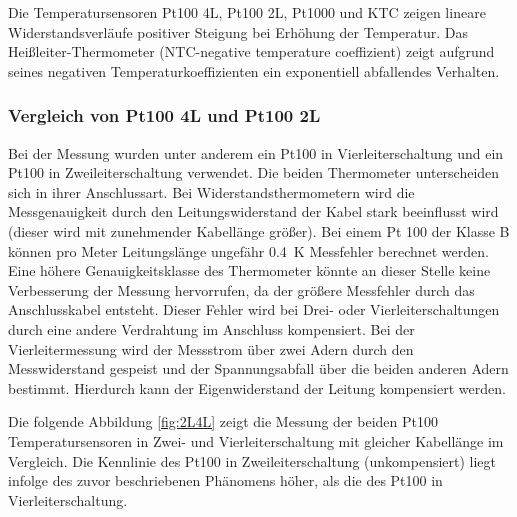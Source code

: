 Die Temperatursensoren Pt100 4L, Pt100 2L, Pt1000 und KTC zeigen lineare Widerstandsverläufe positiver Steigung bei Erhöhung der Temperatur. Das Heißleiter-Thermometer (NTC-negative temperature coeffizient) zeigt aufgrund seines negativen Temperaturkoeffizienten ein exponentiell abfallendes Verhalten. 

\subsubsection{Vergleich von Pt100 4L und Pt100 2L}

Bei der Messung wurden unter anderem ein Pt100 in Vierleiterschaltung und ein Pt100 in Zweileiterschaltung verwendet. Die beiden Thermometer unterscheiden sich in ihrer Anschlussart. Bei Widerstandsthermometern wird die Messgenauigkeit durch den Leitungswiderstand der Kabel stark beeinflusst wird (dieser wird mit zunehmender Kabellänge größer). Bei einem Pt 100 der Klasse B können pro Meter Leitungslänge ungefähr \SI{0,4}{\kelvin} Messfehler berechnet werden. Eine höhere Genauigkeitsklasse des Thermometer könnte an dieser Stelle keine Verbesserung der Messung hervorrufen, da der größere Messfehler durch das Anschlusskabel entsteht. 
Dieser Fehler wird bei Drei- oder Vierleiterschaltungen durch eine andere Verdrahtung im Anschluss kompensiert. Bei der Vierleitermessung wird der Messstrom über zwei Adern durch den Messwiderstand gespeist und der Spannungsabfall über die beiden anderen Adern bestimmt. Hierdurch kann der Eigenwiderstand der Leitung kompensiert werden.


Die folgende Abbildung \ref{fig:2L4L} zeigt die Messung der beiden Pt100 Temperatursensoren in Zwei- und Vierleiterschaltung mit gleicher Kabellänge im Vergleich. Die Kennlinie des Pt100 in Zweileiterschaltung (unkompensiert) liegt infolge des zuvor beschriebenen Phänomens höher, als die des Pt100 in Vierleiterschaltung. 

